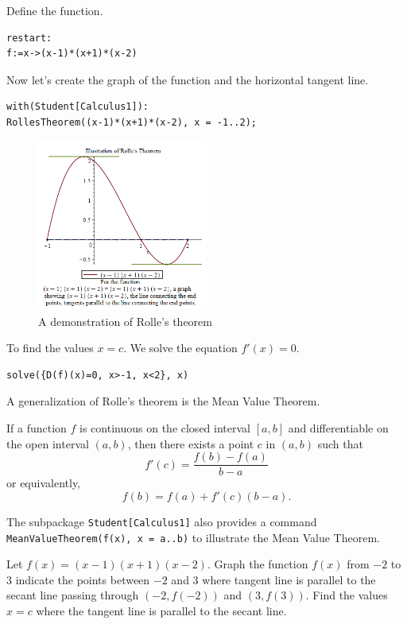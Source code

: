\documentclass[
  en,11pt,simple]{elegantbook}
\renewenvironment{example}[1][]{
  \refstepcounter{exam}
  \par\noindent\textbf{\color{main}{\examplename} \theexam #1}
  \rmfamily
}{
  \par\ignorespacesafterend
}
\begin{document}
\begin{solution}
{}
Define the function.

\begin{verbatim}
restart:
f:=x->(x-1)*(x+1)*(x-2)
\end{verbatim}

Now let's create the graph of the function and the horizontal tangent line.

\begin{verbatim}
with(Student[Calculus1]):
RollesTheorem((x-1)*(x+1)*(x-2), x = -1..2);
\end{verbatim}

\begin{figure}
\centering
\includegraphics[width=0.5\textwidth,height=\textheight]{figs/Rolletheorem.png}
\caption{A demonstration of Rolle's theorem}
\end{figure}

To find the values \(x=c\). We solve the equation \(f'(x)=0\).

\begin{verbatim}
solve({D(f)(x)=0, x>-1, x<2}, x)
\end{verbatim}
\end{solution}

A generalization of Rolle's theorem is the Mean Value Theorem.

If a function \(f\) is continuous on the closed interval \([a, b]\) and differentiable on the open interval \((a, b)\), then there exists a point \(c\) in \((a, b)\) such that
\[
f'(c)=\dfrac{f(b)-f(a)}{b-a}
\]
or equivalently,
\[
f(b)=f(a)+f'(c)(b-a).
\]

The subpackage \texttt{Student{[}Calculus1{]}} also provides a command \texttt{MeanValueTheorem(f(x),\ x\ =\ a..b)} to illustrate the Mean Value Theorem.

\begin{example}

Let \(f(x)=(x-1)(x+1)(x-2)\). Graph the function \(f(x)\) from \(-2\) to \(3\) indicate the points between \(-2\) and \(3\) where tangent line is parallel to the secant line passing through \((-2, f(-2))\) and \((3, f(3))\). Find the values \(x=c\) where the tangent line is parallel to the secant line.
\end{example}
\end{document}
